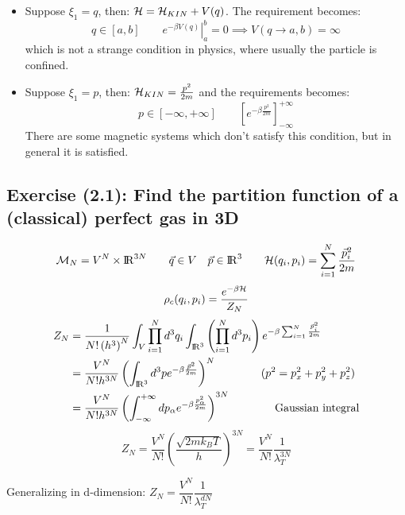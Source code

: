 \begin{itemize}
    \item Suppose $\xi_1 = q$, then: $\mathcal{H} = \mathcal{H}_{KIN} + V(q)$. The requirement becomes:
    $$q \in [a,b] \qquad \left.e^{-\beta V(q)}\right|_a^b = 0 \implies V(q\to a,b) = \infty$$
    which is not a strange condition in physics, where usually the particle is confined.
    \item Suppose $\xi_1 = p$, then: $\mathcal{H} _{KIN} = \frac{p^2}{2m}$ and the requirements becomes:
    $$ p \in [-\infty,+\infty] \qquad \left[e^{-\beta\frac{p^2}{2m}}\right]_{-\infty}^{+\infty}$$
    There are some magnetic systems which don't satisfy this condition, but in general it is satisfied.
\end{itemize}

\subsection{Exercise (2.1): Find the partition function of a (classical) perfect gas in 3D}
$$ \mathcal{M}_N = V^N \times {\rm I\!R}^{3N} \qquad \vec{q} \in V \quad \vec p \in {\rm I\!R}^3 \qquad \mathcal{H}(q_i,p_i) = \sum_{i=1}^N \frac{{\vec p_i}^2}{2m}$$
$$ \rho_c(q_i,p_i) = \frac{e^{-\beta\mathcal{H}}}{Z_N}$$
\begin{align*}
Z_N &= \frac1{N!\left(h^3\right)^N} \int_V \prod_{i=1}^N d^3q_i \int_{{\rm I\!R}^3}\left(\prod_{i=1}^N d^3 p_i\right) e^{-\beta \sum_{i=1}^N \frac{\vec p_i^2}{2m}}\\
&= \frac{V^N}{N!h^{3N}} \left(\int_{{\rm I\!R}^3} d^3p e ^{-\beta \frac{\vec p^2}{2m}}\right)^N \qquad \qquad (p^2 = p_x^2 + p_y^2 + p_z^2) \\
&= \frac{V^N}{N!h^{3N}} \left(\int_{-\infty}^{+\infty} dp_\alpha e ^{-\beta \frac{p_\alpha^2}{2m}}\right)^{3N} \qquad \qquad \text{Gaussian integral}
\end{align*}
$$ \boxed{Z_N = \frac{V^N}{N!}\left(\frac{\sqrt{2mk_BT}}h\right)^{3N} = \frac{V^N}{N!} \frac 1{\lambda_T^{3N}} }$$

Generalizing in d-dimension: $Z_N = \dfrac{V^N}{N!} \dfrac1{\lambda_T^{dN}}$\\

